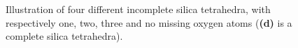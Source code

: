 \begin{figure}[htpb]
\begin{subfigure}[c]{1.1\myfigwidth}
        \caption{}%
    \end{subfigure}%
    \caption{%
        Illustration of four different incomplete silica tetrahedra, with respectively one, two, three and no missing oxygen atoms (\textbf{(d)} is a complete silica tetrahedra).%
    }%
    \label{fig:passivation}%
\end{figure}%






